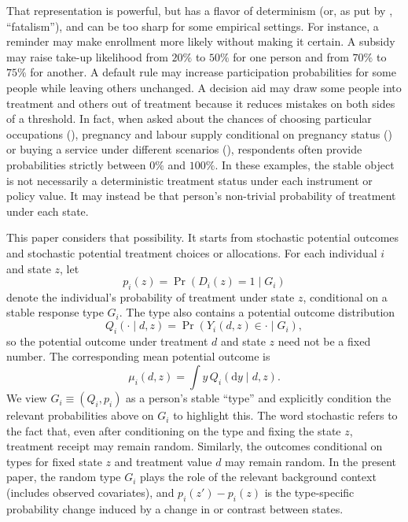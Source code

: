 \documentclass[11pt]{article}
\newcommand{\1}{\mathbf{1}}
\newcommand{\dd}{\mathrm{d}}
\begin{document}
That representation is powerful, but has a flavor of determinism  (or, as put by \cite{dawid2000}, ``fatalism''), and can be too sharp for some empirical settings.  For instance, a reminder may make enrollment more likely without making it certain. A subsidy may raise take-up likelihood from $20\%$ to $50\%$ for one person and from $70\%$ to $75\%$ for another. A default rule may increase participation probabilities for some people while leaving others unchanged. A decision aid may draw some people into treatment and others out of treatment because it reduces mistakes on both sides of a threshold.   In fact, when asked about the chances of choosing particular occupations (\cite{arcidiaconoetal2020}), pregnancy and labour supply conditional on pregnancy status (\cite{briggsetal2024}) or buying a service under different scenarios (\cite{blasslachmanski2010}), respondents often provide probabilities strictly between $0\%$ and $100\%$.  In these examples, the stable object is not necessarily a deterministic treatment status under each instrument or policy value. It may instead be that person's non-trivial probability of treatment under each state.

This paper considers that possibility. It starts from stochastic potential outcomes and stochastic potential treatment choices or allocations. For each individual $i$ and state $z$, let
\[
        p_i(z)=\Pr(D_i(z)=1\mid G_i)
\]
denote the individual's probability of treatment under state $z$, conditional on a stable response type $G_i$. The type also contains a potential outcome distribution
\[
        Q_i(\cdot\mid d,z) = \Pr(Y_i(d,z)\in \cdot \mid G_i),
\]
so the potential outcome under treatment $d$ and state $z$ need not be a fixed number. The corresponding mean potential outcome is
\[
        \mu_i(d,z)=\int y\,Q_i(\dd y\mid d,z).
\]
We view $G_i \equiv (Q_i, p_i)$ as a person's stable ``type'' and explicitly condition the relevant probabilities above on $G_i$ to highlight this. The word stochastic refers to the fact that, even after conditioning on the type and fixing the state $z$, treatment receipt may remain random.  Similarly, the outcomes conditional on types for fixed state $z$ and treatment value $d$ may remain random.  In the present paper, the random type $G_i$ plays the role of the relevant background context (includes observed covariates), and $p_i(z')-p_i(z)$ is the type-specific probability change induced by a change in or contrast between states.
\end{document}
